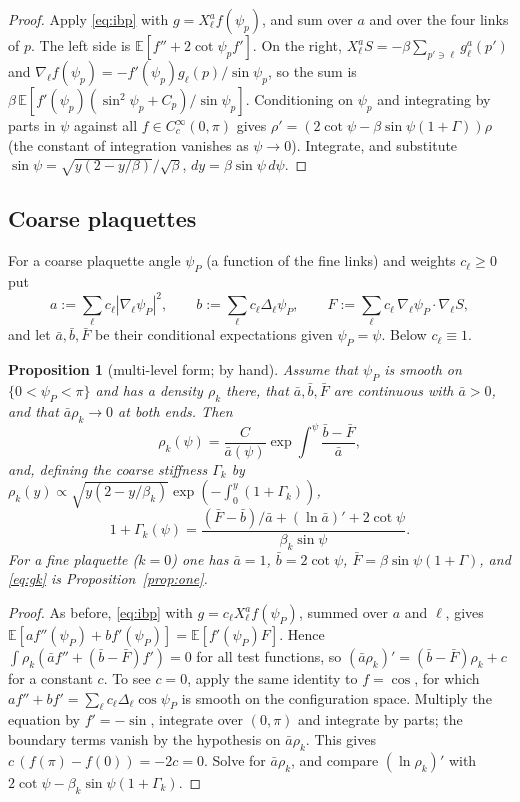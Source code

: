 \documentclass[11pt,a4paper]{article}
\newtheorem{proposition}[theorem]{Proposition}
\theoremstyle{definition}
\theoremstyle{remark}
\newcommand{\E}{\mathbb{E}}
\newcommand{\abar}{\bar a}
\newcommand{\bbar}{\bar b}
\newcommand{\Fbar}{\bar F}
\begin{document}
\begin{proof}
Apply \eqref{eq:ibp} with $g=X^a_\ell f(\psi_p)$, and sum over $a$ and over the four links of $p$. The left side is $\E[f''+2\cot\psi_p f']$. On the right, $X^a_\ell S=-\beta\sum_{p'\ni\ell}g^a_\ell(p')$ and $\nabla_\ell f(\psi_p)=-f'(\psi_p)g_\ell(p)/\sin\psi_p$, so the sum is $\beta\,\E[f'(\psi_p)(\sin^2\psi_p+C_p)/\sin\psi_p]$. Conditioning on $\psi_p$ and integrating by parts in $\psi$ against all $f\in C_c^\infty(0,\pi)$ gives $\rho'=(2\cot\psi-\beta\sin\psi(1+\Gamma))\rho$ (the constant of integration vanishes as $\psi\to0$). Integrate, and substitute $\sin\psi=\sqrt{y(2-y/\beta)}/\sqrt\beta$, $dy=\beta\sin\psi\,d\psi$.
\end{proof}

\subsection{Coarse plaquettes}

For a coarse plaquette angle $\psi_P$ (a function of the fine links) and weights $c_\ell\ge0$ put
\[
a:=\sum_\ell c_\ell|\nabla_\ell\psi_P|^2,\qquad b:=\sum_\ell c_\ell\Delta_\ell\psi_P,\qquad F:=\sum_\ell c_\ell\,\nabla_\ell\psi_P\cdot\nabla_\ell S,
\]
and let $\abar,\bbar,\Fbar$ be their conditional expectations given $\psi_P=\psi$. Below $c_\ell\equiv1$.

\begin{proposition}[multi-level form; by hand]\label{prop:multi}
Assume that $\psi_P$ is smooth on $\{0<\psi_P<\pi\}$ and has a density $\rho_k$ there, that $\abar,\bbar,\Fbar$ are continuous with $\abar>0$, and that $\abar\rho_k\to0$ at both ends. Then
\[
\rho_k(\psi)=\frac{C}{\abar(\psi)}\exp\int^\psi\frac{\bbar-\Fbar}{\abar},
\]
and, defining the coarse stiffness $\Gamma_k$ by $\rho_k(y)\propto\sqrt{y(2-y/\beta_k)}\exp(-\int_0^y(1+\Gamma_k))$,
\begin{equation}\label{eq:gk}
1+\Gamma_k(\psi)=\frac{(\Fbar-\bbar)/\abar+(\ln\abar)'+2\cot\psi}{\beta_k\sin\psi}.
\end{equation}
For a fine plaquette ($k=0$) one has $\abar=1$, $\bbar=2\cot\psi$, $\Fbar=\beta\sin\psi(1+\Gamma)$, and \eqref{eq:gk} is Proposition~\ref{prop:one}.
\end{proposition}

\begin{proof}
As before, \eqref{eq:ibp} with $g=c_\ell X^a_\ell f(\psi_P)$, summed over $a$ and $\ell$, gives $\E[af''(\psi_P)+bf'(\psi_P)]=\E[f'(\psi_P)F]$. Hence $\int\rho_k(\abar f''+(\bbar-\Fbar)f')=0$ for all test functions, so $(\abar\rho_k)'=(\bbar-\Fbar)\rho_k+c$ for a constant $c$. To see $c=0$, apply the same identity to $f=\cos$, for which $af''+bf'=\sum_\ell c_\ell\Delta_\ell\cos\psi_P$ is smooth on the configuration space. Multiply the equation by $f'=-\sin$, integrate over $(0,\pi)$ and integrate by parts; the boundary terms vanish by the hypothesis on $\abar\rho_k$. This gives $c\,(f(\pi)-f(0))=-2c=0$. Solve for $\abar\rho_k$, and compare $(\ln\rho_k)'$ with $2\cot\psi-\beta_k\sin\psi(1+\Gamma_k)$.
\end{proof}
\end{document}

